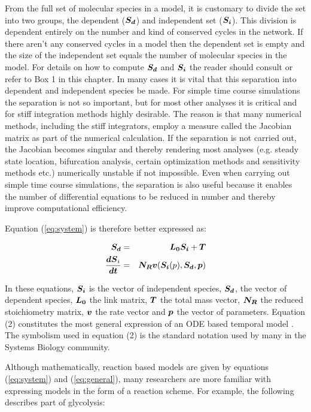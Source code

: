\documentclass[12pt]{article}
\newcommand{\bT}{\mbox{\boldmath $T$}}
\newcommand{\bLo}{\mbox{\boldmath $L_0$}}
\newcommand{\bNr}{\mbox{\boldmath $N_R$}}
\newcommand{\bSi}{\mbox{\boldmath $S_i$}}
\newcommand{\bSd}{\mbox{\boldmath $S_d$}}
\newcommand{\bdS}{\mbox{\boldmath $dS$}}
\newcommand{\bdt}{\mbox{\boldmath $dt$}}
\newcommand{\bdSidt}{\mbox{$\displaystyle \frac{\bdS_i}{\bdt}$}}
\newcommand{\bv}{\mbox{\boldmath $v$}}
\newcommand{\bp}{\mbox{\boldmath $p$}}
\begin{document}
From the full set of molecular species in a model, it is customary
to divide the set into two groups, the dependent ($\bSd$) and
independent set ($\bSi$). This division is dependent entirely on
the number and kind of conserved cycles in the network. If there aren't any conserved
cycles in a model then the dependent set is empty and the size of
the independent set equals the number of molecular species in the
model. For details on how to compute $\bSd$ and $\bSi$ the reader
should consult \cite{Sauro:ICycles2004} or refer to Box 1 in this chapter.
In many cases it is vital that this separation into dependent and independent species be made. For simple time course simulations the separation is not so important, but for most other analyses it is critical and for stiff integration methods highly desirable. The reason is
that many numerical methods, including the stiff integrators, employ a measure called the
Jacobian matrix as part of the numerical calculation. If the separation is not carried out, the
Jacobian becomes singular and thereby rendering most analyses (e.g. steady state location, bifurcation analysis, certain optimization methods and sensitivity methods etc.) numerically
unstable if not impossible. Even when carrying out simple time course simulations, the separation is also useful because it enables the number of differential equations to be reduced in number and thereby improve computational efficiency.

Equation (\ref{eq:system}) is therefore better expressed as:

{ \addtolength{\jot}{6pt}
\begin{eqnarray}
  \bSd &=& \bLo \bSi + \bT \nonumber \\
  \bdSidt &=& \bNr \bv (\bSi (p), \bSd, \bp) \label{eq:general}
\end{eqnarray} }

In these equations, $\bSi$ is the vector of independent species,
$\bSd$, the vector of dependent species, $\bLo$ the link matrix,
$\bT$ the total mass vector, $\bNr$ the reduced stoichiometry
matrix, $\bv$ the rate vector and $\bp$ the vector of parameters. Equation (2)
constitutes the most general expression of an ODE based temporal model \cite{hofmeyr-nutshell,Schuster:Book}. The symbolism used in equation (2) is the standard
notation used by many in the Systems Biology community.

Although mathematically, reaction based models are given by
equations (\ref{eq:system}) and (\ref{eq:general}), many researchers
are more familiar with expressing models in the form of a reaction scheme. For example,
the following describes part of glycolysis:
\end{document}
